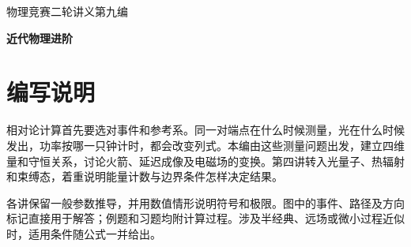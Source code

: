 \documentclass[UTF8,11pt,twoside,openany]{ctexbook}
\begin{document}
\frontmatter
\begin{titlepage}\centering\vspace*{28mm}
{\Large 物理竞赛二轮讲义\quad 第九编\par}\vspace{8mm}
{\Huge\bfseries 近代物理进阶\par}\vspace{12mm}{\Large 物理竞赛二轮讲义\par}\vfill\end{titlepage}
\chapter*{编写说明}
相对论计算首先要选对事件和参考系。同一对端点在什么时候测量，光在什么时候发出，功率按哪一只钟计时，都会改变列式。本编由这些测量问题出发，建立四维量和守恒关系，讨论火箭、延迟成像及电磁场的变换。第四讲转入光量子、热辐射和束缚态，着重说明能量计数与边界条件怎样决定结果。

各讲保留一般参数推导，并用数值情形说明符号和极限。图中的事件、路径及方向标记直接用于解答；例题和习题均附计算过程。涉及半经典、远场或微小过程近似时，适用条件随公式一并给出。
\tableofcontents
\mainmatter




\end{document}
